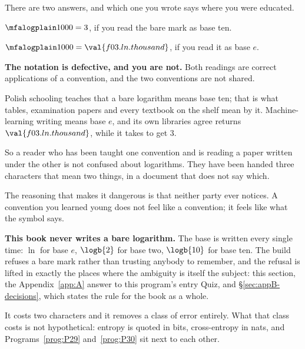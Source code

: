\begin{fr}
\begin{ansblock}
There are two answers, and which one you wrote says where you were educated.

$\mfalogplain 1000 = 3$, if you read the bare mark as base ten.

$\mfalogplain 1000 = \val{f03.ln.thousand}$, if you read it as base $e$.
\end{ansblock}

\begin{trapbox}
\textbf{The notation is defective, and you are not.} Both readings are correct
applications of a convention, and the two conventions are not shared.

Polish schooling teaches that a bare logarithm means base ten; that is what
tables, examination papers and every textbook on the shelf mean by it.
Machine-learning writing means base $e$, and its own libraries agree \dash{}
 returns $\val{f03.ln.thousand}$, while it takes
 to get $3$.

So a reader who has been taught one convention and is reading a paper written
under the other is not confused about logarithms. They have been handed three
characters that mean two things, in a document that does not say which.

The reasoning that makes it dangerous is that neither party ever notices. A
convention you learned young does not feel like a convention; it feels like
what the symbol says.
\end{trapbox}

\begin{notationbox}
\textbf{This book never writes a bare logarithm.} The base is written every
single time: $\ln$ for base $e$, $\logb{2}$ for base two, $\logb{10}$ for base
ten. The build refuses a bare mark rather than trusting anybody to remember,
and the refusal is lifted in exactly the places where the ambiguity is itself
the subject: this section, the Appendix~\ref{app:A} answer to this program's
entry Quiz, and \S\ref{sec:appB-decisions}, which states the rule for the book
as a whole.

It costs two characters and it removes a class of error entirely. What that
class costs is not hypothetical: entropy is quoted in bits, cross-entropy in
nats, and Programs~\ref{prog:P29} and~\ref{prog:P30} sit next to each other.
\end{notationbox}
\end{fr}

